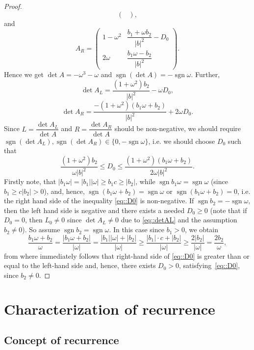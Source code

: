 \documentclass[a4paper,11pt]{amsart}
\theoremstyle{definition}
\DeclareMathOperator{\sgn}{sgn}
\begin{document}
\begin{proof}
$$\begin{pmatrix}
\end{pmatrix},
$$
and
$$
A_R=
\begin{pmatrix}
1-\omega^2&\dfrac{b_1+\omega b_2}{|b|^2}-D_0\\
2\omega&\dfrac{b_1\omega - b_2}{|b|^2}
\end{pmatrix}.
$$
Hence we get
$\det A=-\omega^3-\omega$ and $\sgn(\det A)=-\sgn \omega$. Further,
\begin{equation}\label{eq::detAL}
\det A_L=\dfrac{(1+\omega^2)b_2}{|b|^2}-\omega D_0,
\end{equation}
$$
\det A_R=\dfrac{-(1+\omega^2)(b_1\omega+b_2)}{|b|^2}+2\omega D_0.
$$
Since $L=\dfrac{\det A_L}{\det A}$ and $R=\dfrac{\det A_R}{\det A}$ should be non-negative, we should require $\sgn(\det A_L), \sgn(\det A_R)\in \{0, -\sgn \omega\}$, i.e. we should choose $D_0$ such that
\begin{equation}\label{eq::D0}
\dfrac{(1+\omega^2)b_2}{\omega |b|^2}\le D_0\le \dfrac{(1+\omega^2)(b_1\omega + b_2)}{2 \omega |b|^2}. 
\end{equation}
Firstly note, that $|b_1\omega|=|b_1||\omega|\ge b_1c\ge|b_2|$, while $\sgn b_1\omega=\sgn \omega$ (since $b_1\ge c|b_2|>0$), and, hence, $\sgn(b_1\omega + b_2)=\sgn \omega$ or $\sgn(b_1\omega+b_2)=0$, i.e. the right hand side of the inequality \eqref{eq::D0} is non-negative. If $\sgn b_2=-\sgn \omega$, then the left hand side is negative and there exists a needed $D_0\ge 0$ (note that if $D_0=0$, then $L_0\ne 0$ since $\det A_L\ne 0$ due to \eqref{eq::detAL} and the assumption $b_2\ne 0$). So assume $\sgn b_2=\sgn \omega$. In this case since $b_1>0$, we obtain 
$$
\dfrac{b_1\omega+b_2}{\omega}=\dfrac{|b_1\omega+b_2|}{|\omega|}=\dfrac{|b_1||\omega|+|b_2|}{|\omega|}\ge \dfrac{|b_1|\cdot c+|b_2|}{|\omega|}\ge \dfrac{2|b_2|}{|\omega|}= \dfrac{2b_2}{\omega},
$$
from where immediately follows that right-hand side of  \eqref{eq::D0} is greater than or equal  to the left-hand side and, hence, there exists $D_0>0$, satisfying~\eqref{eq::D0}, since $b_2\ne 0$. 

\end{proof}






\section{Characterization of recurrence}
\label{section:recurrence}
\subsection{Concept of recurrence}
\end{document}
